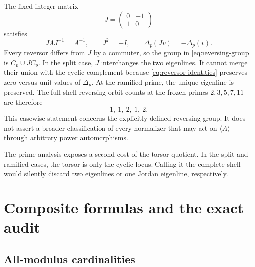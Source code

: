 \documentclass[11pt]{article}
\theoremstyle{definition}
\theoremstyle{remark}
\begin{document}
The fixed integer matrix
\begin{equation}
  J=\begin{pmatrix}0&-1\\1&0\end{pmatrix}
  \label{eq:reversor}
\end{equation}
satisfies
\begin{equation}
  JAJ^{-1}=A^{-1},
  \qquad J^2=-I,
  \qquad \Delta_p(Jv)=-\Delta_p(v).
  \label{eq:reversor-identities}
\end{equation}
Every reversor differs from \(J\) by a commuter, so the group in
\eqref{eq:reversing-group} is \(C_p\cup JC_p\).  In the split case, \(J\)
interchanges the two eigenlines.  It cannot merge their union with the
cyclic complement because \eqref{eq:reversor-identities} preserves zero
versus unit values of \(\Delta_p\).  At the ramified prime, the unique
eigenline is preserved.  The full-shell reversing-orbit counts at the frozen
primes \(2,3,5,7,11\) are therefore
\begin{equation}
  1,\ 1,\ 2,\ 1,\ 2.
  \label{eq:reversing-counts}
\end{equation}
This casewise statement concerns the explicitly defined reversing group.  It
does not assert a broader classification of every normalizer that may act on
\(\langle A\rangle\) through arbitrary power automorphisms.

The prime analysis exposes a second cost of the torsor quotient.  In the
split and ramified cases, the torsor is only the cyclic locus.  Calling it the
complete shell would silently discard two eigenlines or one Jordan
eigenline, respectively.

\section{Composite formulas and the exact audit}
\label{sec:composite-audit}

\subsection{All-modulus cardinalities}
\end{document}
